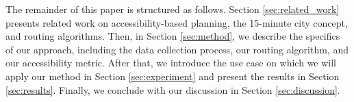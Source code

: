 The remainder of this paper is structured as follows.
Section \ref{sec:related_work} presents related work on accessibility-based planning, the 15-minute city concept, and routing algorithms.
Then, in Section \ref{sec:method}, we describe the specifics of our approach, including the data collection process, our routing algorithm, and our accessibility metric.
After that, we introduce the use case on which we will apply our method in Section \ref{sec:experiment} and present the results in Section \ref{sec:results}.
Finally, we conclude with our discussion in Section \ref{sec:discussion}.

